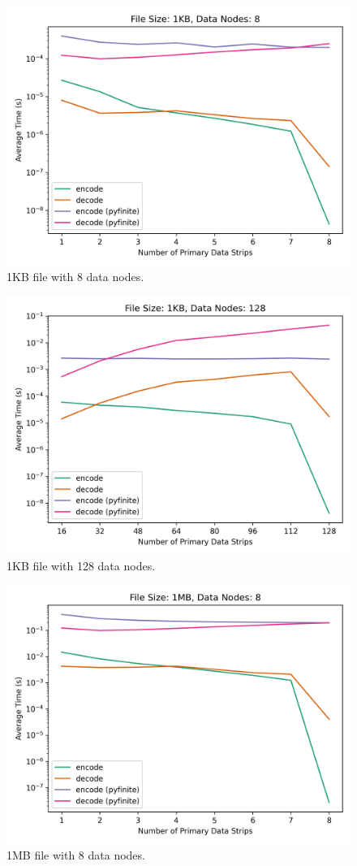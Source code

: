 \documentclass[conference]{IEEEtran}
\begin{document}
\begin{figure}[htbp]
    \centering
    \includegraphics[width=0.8\columnwidth
]{images/encode-decode-size-1KB-n-8.png}
    \caption{1KB file with 8 data nodes.}
    \label{fig:encode-decode-1KB-8}
\end{figure}

\begin{figure}[htbp]
    \centering
    \includegraphics[width=0.8\columnwidth
]{images/encode-decode-size-1KB-n-128.png}
    \caption{1KB file with 128 data nodes.}
    \label{fig:encode-decode-1KB-128}
\end{figure}

\begin{figure}[htbp]
    \centering
    \includegraphics[width=0.8\columnwidth
]{images/encode-decode-size-1MB-n-8.png}
    \caption{1MB file with 8 data nodes.}
    \label{fig:encode-decode-1MB-8}
\end{figure}
\end{document}
